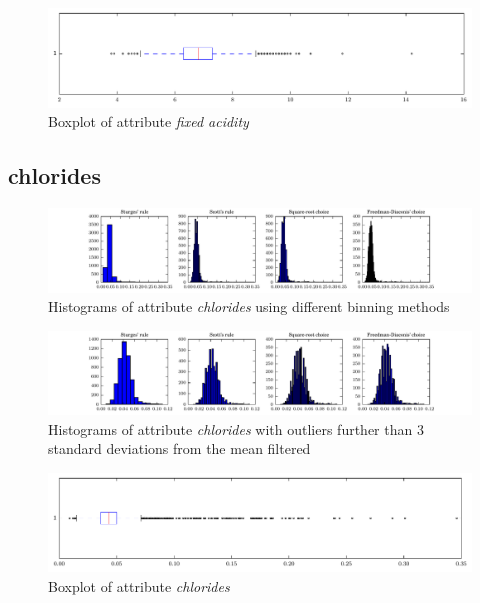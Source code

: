 \documentclass{report}
\begin{document}
\begin{figure}[H]
\includegraphics[width=\textwidth]{boxplots/fixed_acidity.pdf}
\caption{Boxplot of attribute \emph{fixed acidity}}\end{figure}

\newpage\subsection{chlorides}
\begin{figure}[H]
\includegraphics[width=\textwidth]{histograms/chlorides.pdf}
\caption{Histograms of attribute \emph{chlorides} using different binning methods}\end{figure}

\begin{figure}[H]
\includegraphics[width=\textwidth]{histograms/chlorides_filtered.pdf}
\caption{Histograms of attribute \emph{chlorides} with outliers further than 3 standard deviations from the mean filtered}
\end{figure}

\begin{figure}[H]
\includegraphics[width=\textwidth]{boxplots/chlorides.pdf}
\caption{Boxplot of attribute \emph{chlorides}}\end{figure}
\end{document}
